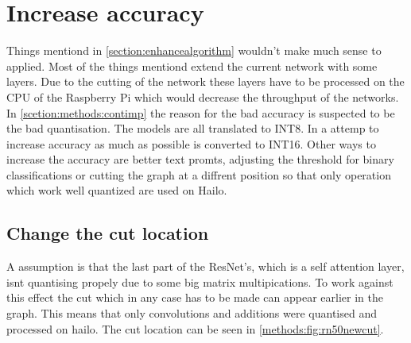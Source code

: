 \section{Increase accuracy}

Things mentiond in \cref{section:enhancealgorithm} wouldn't make much sense to applied.
Most of the things mentiond extend the current network with some layers.
Due to the cutting of the network these layers have to be processed on the CPU of the Raspberry Pi which would decrease the throughput of the networks.
In \cref{scetion:methods:contimp} the reason for the bad accuracy is suspected to be the bad quantisation.
The models are all translated to INT8.
In a attemp to increase accuracy as much as possible is converted to INT16.
Other ways to increase the accuracy are better text promts, adjusting the threshold for binary classifications or cutting the graph at a diffrent position so that only operation which work well quantized are used on Hailo.

\subsection{Change the cut location
\label{methods:sec:cutlocation}}
A assumption is that the last part of the ResNet's, which is a self attention layer, isnt quantising propely due to some big matrix multipications.
To work against this effect the cut which in any case has to be made can appear earlier in the graph.
This means that only convolutions and additions were quantised and processed on hailo.
The cut location can be seen in \cref{methods:fig:rn50newcut}.



